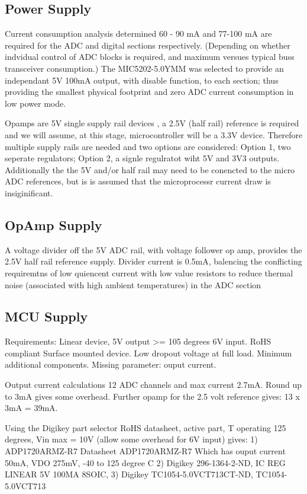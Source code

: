 \subsection{Power Supply}
Current consumption analysis determined 60 - 90 mA and 77-100 mA are required for the ADC and digital sections respectively. (Depending on whether indvidual control of ADC blocks is required, and maximum versues typical buss transceiver consumption.) 
The MIC5202-5.0YMM was selected to provide an independant 5V 100mA output, with disable function, to each section; thus providing the smallest physical footprint and zero ADC current consumption in low power mode.

Opamps are 5V single supply rail devices , a 2.5V (half rail) reference is required and we will assume, at this stage, microcontroller will be a 3.3V device. 
Therefore multiple supply rails are needed and two options are considered: Option 1, two seperate regulators; Option 2, a signle regulratot wiht 5V and 3V3 outputs. 
Additionally the the 5V and/or half rail may need to be conencted to the micro ADC references, but is is assumed that the microprocessr current draw is insiginificant.

\subsection{OpAmp Supply}
A voltage divider off the 5V ADC rail, with voltage follower op amp, provides the 2.5V half rail reference supply. Divider current is 0.5mA, balencing the conflicting requiremtns of low quiencent current with low value resistors to reduce thermal noise (associated with high ambient temperatures) in the ADC section

\subsection{MCU Supply}


Requirements: Linear device,
5V output
>= 105 degrees
6V input.
RoHS compliant
Surface mounted device.
Low dropout voltage at full load. 
Minimum additional components.
Missing parameter: ouput current.

Output current calculations
12 ADC channels and max current 2.7mA. Round up to 3mA gives some overhead.
Further opamp for the 2.5 volt reference gives: 13 x 3mA = 39mA.

Using the Digikey part selector 
RoHS datasheet, active part, T operating 125 degrees, Vin max = 10V (allow some overhead for 6V input) gives:
1)
ADP1720ARMZ-R7
Datasheet ADP1720ARMZ-R7
Which has ouput current 50mA, VDO 275mV, -40 to 125 degree C
2)
Digikey 296-1364-2-ND, IC REG LINEAR 5V 100MA 8SOIC,
3)
Digikey TC1054-5.0VCT713CT-ND, TC1054-5.0VCT713 

